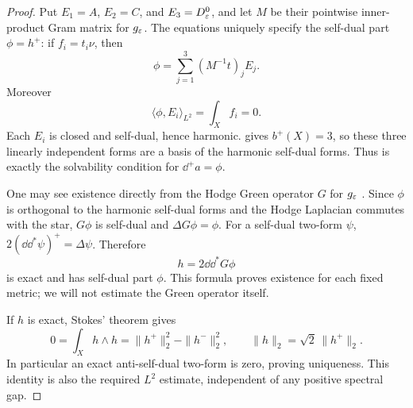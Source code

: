 \begin{proof}
Put $E_1=A$, $E_2=C$, and $E_3=D^0_\varepsilon$, and let $M$ be their
pointwise inner-product Gram matrix for $g_\varepsilon$.  The equations
uniquely specify the self-dual part $\phi=h^+$: if
$f_i=t_i\nu$, then
\begin{equation}
  \phi=\sum_{j=1}^3(M^{-1}t)_jE_j.
  \label{eq:auxiliary-selfdual-data}
\end{equation}
Moreover
\begin{equation}
  \langle\phi,E_i\rangle_{L^2}=\int_X f_i=0.
  \label{eq:auxiliary-cokernel-moments}
\end{equation}
Each $E_i$ is closed and self-dual, hence harmonic.
 gives $b^+(X)=3$, so these three linearly
independent forms are a basis of the harmonic self-dual forms.
Thus  is exactly the solvability
condition for $\dd^+a=\phi$.

One may see existence directly from the Hodge Green operator $G$ for
$g_\varepsilon$ \cite[Equations~(2.1)--(2.2)]{TaylorHodge2010}.
Since $\phi$ is orthogonal to the harmonic self-dual
forms and the Hodge Laplacian commutes with the star, $G\phi$ is
self-dual and $\Delta G\phi=\phi$.  For a self-dual two-form $\psi$,
$2(\dd\dd^*\psi)^+=\Delta\psi$.  Therefore
\begin{equation}
  h=2\dd\dd^*G\phi
  \label{eq:auxiliary-green-formula}
\end{equation}
is exact and has self-dual part $\phi$.  This formula proves
existence for each fixed metric; we will not estimate the Green
operator itself.

If $h$ is exact, Stokes' theorem gives
\begin{equation}
  0=\int_Xh\wedge h
    =\|h^+\|_2^2-\|h^-\|_2^2,
  \qquad
  \|h\|_2=\sqrt2\,\|h^+\|_2.
  \label{eq:auxiliary-exact-ltwo}
\end{equation}
In particular an exact anti-self-dual two-form is zero, proving
uniqueness.  This identity is also the required $L^2$ estimate,
independent of any positive spectral gap.


\end{proof}

